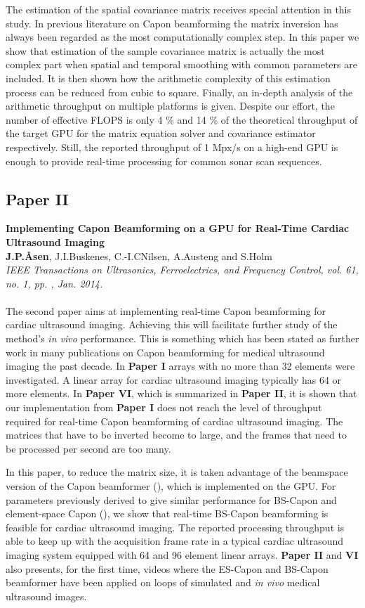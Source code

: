 The estimation of the spatial covariance matrix receives special attention in this study. In previous literature on Capon beamforming the matrix inversion has always been regarded as the most computationally complex step. In this paper we show that estimation of the sample covariance matrix is actually the most complex part when spatial and temporal smoothing with common parameters are included. It is then shown how the arithmetic complexity of this estimation process can be reduced from cubic to square. Finally, an in-depth analysis of the arithmetic throughput on multiple platforms is given. Despite our effort, the number of effective FLOPS is only 4 \% and 14 \% of the theoretical throughput of the target GPU for the matrix equation solver and covariance estimator respectively. Still, the reported throughput of 1 Mpx/s on a high-end GPU is enough to provide real-time processing for common sonar scan sequences.

\subsection{Paper II}
\textbf{Implementing Capon Beamforming on a GPU for Real-Time Cardiac Ultrasound Imaging}\\
\textbf{J.\:P.\:\AA{}sen}, J.\:I.\:Buskenes, C.-I.\:C\:Nilsen, A.\:Austeng and S.\:Holm\\
{\it IEEE Transactions on Ultrasonics, Ferroelectrics, and Frequency Control, vol. 61, no. 1, pp. , Jan. 2014.}\\\\
The second paper aims at implementing real-time Capon beamforming for cardiac ultrasound imaging. Achieving this will facilitate further study of the method's \textit{in vivo} performance. This is something which has been stated as further work in many publications on Capon beamforming for medical ultrasound imaging the past decade. In \textbf{Paper I} arrays with no more than 32 elements were investigated. A linear array for cardiac ultrasound imaging typically has 64 or more elements. In \textbf{Paper VI}, which is summarized in \textbf{Paper II}, it is shown that our implementation from  \textbf{Paper I} does not reach the level of throughput required for real-time Capon beamforming of cardiac ultrasound imaging. The matrices that have to be inverted become to large, and the frames that need to be processed per second are too many.

In this paper, to reduce the matrix size, it is taken advantage of the beamspace version of the Capon beamformer (), which is implemented on the GPU. For parameters previously derived to give similar performance for BS-Capon and element-space Capon (), we show that real-time BS-Capon beamforming is feasible for cardiac ultrasound imaging. The reported processing throughput is able to keep up with the acquisition frame rate in a typical cardiac ultrasound imaging system equipped with 64 and 96 element linear arrays.  \textbf{Paper II} and \textbf{VI} also presents, for the first time, videos where the ES-Capon and BS-Capon beamformer have been applied on loops of simulated and \textit{in vivo} medical ultrasound images.

